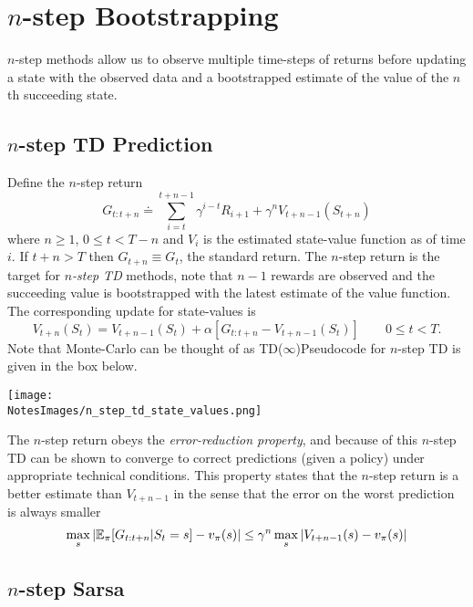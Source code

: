 \section{$n$-step Bootstrapping}
$n$-step methods allow us to observe multiple time-steps of returns before updating a state with the observed data and a bootstrapped estimate of the value of the $n$th succeeding state.

\subsection{$n$-step TD Prediction}
Define the $n$-step return
\begin{equation}
    G_{t:t+n} \doteq \sum_{i=t}^{t+n-1}\gamma^{i-t}R_{i+1} + \gamma^n V_{t+n-1}(S_{t+n})
\end{equation}
where $n \geq 1$, $0 \leq t < T - n$ and $V_i$ is the estimated state-value function as of time $i$. If $t + n > T$ then $G_{t+n} \equiv G_t$, the standard return. The $n$-step return is the target for \emph{$n$-step TD} methods, note that $n-1$ rewards are observed and the succeeding value is bootstrapped with the latest estimate of the value function. The corresponding update for state-values is
\begin{equation}
    V_{t+n}(S_t) = V_{t+n - 1}(S_t) + \alpha [G_{t:t+n} - V_{t+n-1}(S_{t})]  \quad\quad 0 \leq t < T.
\end{equation}
Note that Monte-Carlo can be thought of as TD($\infty$)Pseudocode for $n$-step TD is given in the box below.

\texttt{[image: \\NotesImages/n\_step\_td\_state\_values.png]}

The $n$-step return obeys the \emph{error-reduction property}, and because of this $n$-step TD can be shown to converge to correct predictions (given a policy) under appropriate technical conditions. This property states that the $n$-step return is a better estimate than $V_{t+n-1}$ in the sense that the error on the worst prediction is always smaller
\begin{equation}
    \max_s \left|\mathbb{E}_\pi[G_{t:t+n}|S_t=s] - v_\pi(s)\right| \leq \gamma^n \max_s \left|V_{t+n-1}(s) - v_\pi(s)\right|
\end{equation}

\subsection{$n$-step Sarsa}
